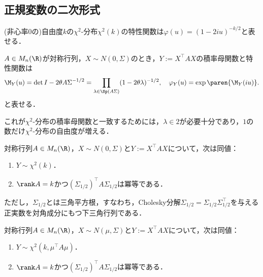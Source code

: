 \documentclass[uplatex, dvipdfmx]{jsreport}
\begin{document}
\subsection{正規変数の二次形式}

\begin{tcolorbox}[colframe=ForestGreen, colback=ForestGreen!10!white,breakable,colbacktitle=ForestGreen!40!white,coltitle=black,fonttitle=\bfseries\sffamily,
title=]
    (非心率$0$の)自由度$k$の$\chi^2$-分布$\chi^2(k)$の特性関数は$\varphi(u)=(1-2iu)^{-k/2}$と表せる．
\end{tcolorbox}

\begin{theorem}[正規確率変数の二次形式]
    $A\in M_n(\R)$が対称行列，$X\sim N(0,\Sigma)$のとき，$Y:=X^\top AX$の積率母関数と特性関数は
    \[\M_Y(u)=\det{I-2\theta A\Sigma}^{-1/2}=\prod_{\lambda\in\Sp(A\Sigma)}(1-2\theta\lambda)^{-1/2},\quad\varphi_Y(u)=\exp\paren{\M_Y(iu)}.\]
    と表せる．
\end{theorem}
\begin{remarks}
    これが$\chi^2$-分布の積率母関数と一致するためには，$\lambda\in2$が必要十分であり，$1$の数だけ$\chi^2$-分布の自由度が増える．
\end{remarks}

\begin{corollary}
    対称行列$A\in M_n(\R)$，$X\sim N(0,\Sigma)$と$Y:=X^\top AX$について，次は同値：
    \begin{enumerate}
        \item $Y\sim \chi^2(k)$．
        \item $\rank A=k$かつ$(\Sigma_{1/2})^\top A\Sigma_{1/2}$は冪等である．
    \end{enumerate}
    ただし，$\Sigma_{1/2}$とは三角平方根，すなわち，Cholesky分解$\Sigma_{1/2}=\Sigma_{1/2}\Sigma_{1/2}^\top$を与える正実数を対角成分にもつ下三角行列である．
\end{corollary}

\begin{proposition}
    対称行列$A\in M_n(\R)$，$X\sim N(\mu,\Sigma)$と$Y:=X^\top AX$について，次は同値：
    \begin{enumerate}
        \item $Y\sim\chi^2(k,\mu^\top A\mu)$．
        \item $\rank A=k$かつ$(\Sigma_{1/2})^\top A\Sigma_{1/2}$は冪等である．
    \end{enumerate}
\end{proposition}
\end{document}
